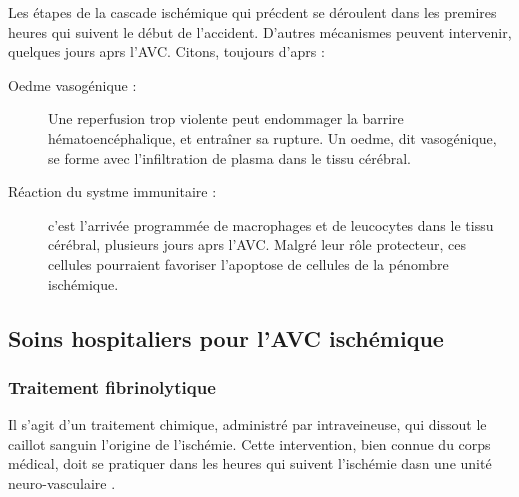 
Les \'etapes de la cascade isch\'emique qui pr\'ecdent se d\'eroulent dans les premires heures qui suivent le d\'ebut de l'accident. %
D'autres m\'ecanismes peuvent intervenir, quelques jours aprs l'AVC. Citons, toujours d'aprs \cite{Durukan_PBB_07} :

\begin{description}
\item[Oedme vasog\'enique :] Une reperfusion trop violente peut endommager la barrire h\'ematoenc\'ephalique, et entra\^iner sa rupture. %
Un oedme, dit vasog\'enique, se forme avec l'infiltration de plasma dans le tissu c\'er\'ebral.
\item[R\'eaction du systme immunitaire :] c'est l'arriv\'ee programm\'ee de macrophages et de leucocytes dans le tissu c\'er\'ebral, plusieurs jours aprs l'AVC. %
Malgr\'e leur r\^ole protecteur, ces cellules pourraient favoriser l'apoptose de cellules de la p\'enombre isch\'emique.
\end{description}

\subsection{Soins hospitaliers pour l'AVC isch\'emique}
%

\subsubsection{Traitement fibrinolytique}

Il s'agit d'un traitement chimique, administr\'e par intraveineuse, qui dissout le caillot sanguin  l'origine de l'isch\'emie. %
Cette intervention, bien connue du corps m\'edical, doit se pratiquer dans les heures qui suivent l'isch\'emie dasn une unit\'e neuro-vasculaire \cite{lar_poly_09}.

